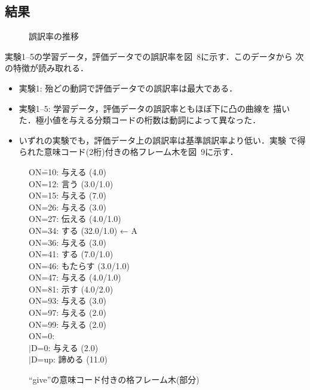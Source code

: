 \subsection{結果}


\begin{figure}
\begin{center}
  
\end{center}
  \caption{誤訳率の推移}
\end{figure}

実験1--5の学習データ，評価データでの誤訳率を図~8に示す．このデータから
次の特徴が読み取れる．
\begin{itemize}
\item 実験1: 殆どの動詞で評価データでの誤訳率は最大である．
\item 実験1--5: 学習データ，評価データの誤訳率ともほぼ下に凸の曲線を
  描いた．極小値を与える分類コードの桁数は動詞によって異なった．
\item いずれの実験でも，評価データ上の誤訳率は基準誤訳率より低い．実験
  で得られた意味コード(2桁)付きの格フレーム木を図~9に示す．
\end{itemize}

\begin{figure}[h]
  \begin{center}
    \begin{minipage}{80mm}
      \large
      \def\baselinestretch{}
      \normalsize
      \begin{tabbing}
        ON\bras{}\==10: 与える (4.0)\\
        ON\bras{}=12: 言う (3.0/1.0)\\
        ON\bras{}=15: 与える (7.0)\\
        ON\bras{}=26: 与える (3.0)\\
        ON\bras{}=27: 伝える (4.0/1.0)\\
        ON\bras{}=34: する (32.0/1.0) ← A\\
        ON\bras{}=36: 与える (3.0)\\
        ON\bras{}=41: する (7.0/1.0)\\
        ON\bras{}=46: もたらす (3.0/1.0)\\
        ON\bras{}=47: 与える (4.0/1.0)\\
        ON\bras{}=81: 示す (4.0/2.0)\\
        ON\bras{}=93: 与える (3.0)\\
        ON\bras{}=97: 与える (2.0)\\
        ON\bras{}=99: 与える (2.0)\\
        ON\bras{}=0:\\
        $|$\>D\bras{}=0: 与える (2.0)\\
        $|$\>D\bras{}=up: 諦める (11.0)
      \end{tabbing}
    \end{minipage}
  \end{center}
  \caption{``give''の意味コード付きの格フレーム木(部分)}
\end{figure}

